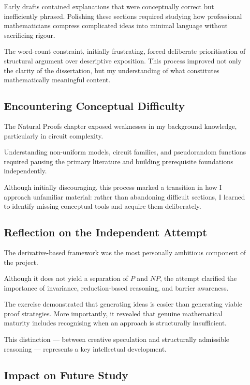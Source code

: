 \documentclass[12pt]{article}
\begin{document}
Early drafts contained explanations that were conceptually correct but inefficiently phrased. Polishing these sections required studying how professional mathematicians compress complicated ideas into minimal language without sacrificing rigour.

The word-count constraint, initially frustrating, forced deliberate prioritisation of structural argument over descriptive exposition. This process improved not only the clarity of the dissertation, but my understanding of what constitutes mathematically meaningful content.

\subsection{Encountering Conceptual Difficulty}

The Natural Proofs chapter exposed weaknesses in my background knowledge, particularly in circuit complexity. 

Understanding non-uniform models, circuit families, and pseudorandom functions required pausing the primary literature and building prerequisite foundations independently.

Although initially discouraging, this process marked a transition in how I approach unfamiliar material: rather than abandoning difficult sections, I learned to identify missing conceptual tools and acquire them deliberately.

\subsection{Reflection on the Independent Attempt}

The derivative-based framework was the most personally ambitious component of the project.

Although it does not yield a separation of $P$ and $NP$, the attempt clarified the importance of invariance, reduction-based reasoning, and barrier awareness.

The exercise demonstrated that generating ideas is easier than generating viable proof strategies. More importantly, it revealed that genuine mathematical maturity includes recognising when an approach is structurally insufficient.

This distinction --- between creative speculation and structurally admissible reasoning --- represents a key intellectual development.

\subsection{Impact on Future Study}
\end{document}
